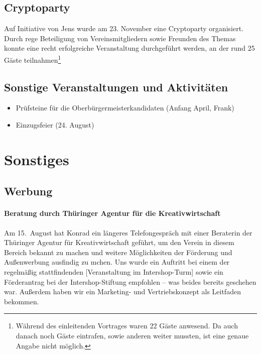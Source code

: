 \documentclass[10pt,DIV16]{scrartcl}
\begin{document}
\subsection{Cryptoparty}

Auf Initiative von Jens wurde am 23. November eine Cryptoparty organisiert.
Durch rege Beteiligung von Vereinsmitgliedern sowie Freunden des Themas konnte
eine recht erfolgreiche Veranstaltung durchgeführt werden, an der rund 25
Gäste teilnahmen\footnote{Während des einleitenden Vortrages waren 22 Gäste
anwesend. Da auch danach noch Gäste eintrafen, sowie anderen weiter mussten,
ist eine genaue Angabe nicht möglich.}

\subsection{Sonstige Veranstaltungen und Aktivitäten}

\begin{itemize}
	\item Prüfsteine für die Oberbürgermeisterkandidaten (Anfang April, Frank)
	\item Einzugsfeier (24. August)
\end{itemize}


\section{Sonstiges}

\subsection{Werbung}

\paragraph{Beratung durch Thüringer Agentur für die Kreativwirtschaft}

Am 15.~August hat Konrad ein längeres Telefongespräch mit einer Beraterin der
Thüringer Agentur für Kreativwirtschaft geführt, um den Verein in diesem
Bereich bekannt zu machen und weitere Möglichkeiten der Förderung und
Außenwerbung ausfindig zu mchen.  Uns wurde ein Auftritt bei einem der
regelmäßig stattfindenden [Veranstaltung im Intershop-Turm] sowie ein
Förderantrag bei der Intershop-Stiftung empfohlen -- was beides bereits
geschehen war.  Außerdem haben wir ein Marketing- und Vertriebskonzept als
Leitfaden bekommen.
\end{document}
